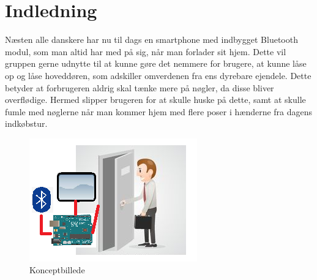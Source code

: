 \graphicspath{{Chapters/Indledning/}}

\section{Indledning}
Næsten alle danskere har nu til dags en smartphone med indbygget Bluetooth modul, som man altid har med på sig, når man forlader sit hjem. Dette vil gruppen gerne udnytte til at kunne gøre det nemmere for brugere, at kunne låse op og låse hoveddøren, som adskiller omverdenen fra ens dyrebare ejendele. Dette betyder at forbrugeren aldrig skal tænke mere på nøgler, da disse bliver overflødige. Hermed slipper brugeren for at skulle huske på dette, samt at skulle fumle med nøglerne når man kommer hjem med flere poser i hænderne fra dagens indkøbstur. 

\begin{figure}[H]
	\centering
	\includegraphics[width = 300 pt]{Img/Konceptbillede.png}
	\caption{Konceptbillede}
	\label{fig:Konceptbillede}
\end{figure}
